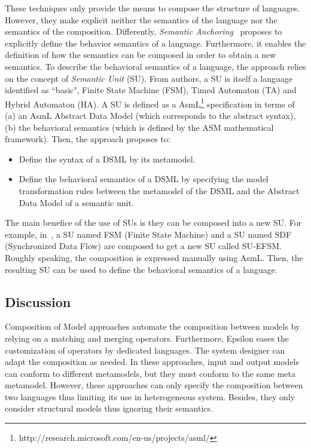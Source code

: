 These techniques only provide the means to compose the structure of languages. However, they make explicit neither the semantics of the language nor the semantics of the composition. Differently, \emph{Semantic Anchoring}~\cite{semanticsanchoring} proposes to explicitly define the behavior semantics of a language. Furthermore, it enables the definition of how the semantics can be composed in order to obtain a new semantics. To describe the behavioral semantics of a language, the approach relies on the concept of \emph{Semantic Unit} (SU). From authors, a SU is itself a language identified as ``basic", \eg Finite State Machine (FSM), Timed Automaton (TA) and Hybrid Automaton (HA). A SU is defined as a AsmL\footnote{http://research.microsoft.com/en-us/projects/asml/} specification in terms of (a) an AsmL Abstract Data Model (which corresponds to the abstract syntax), (b) the behavioral semantics (which is defined by the ASM mathematical framework). Then, the approach proposes to:
\begin{itemize}
	\item Define the syntax of a DSML by its metamodel. 
	\item Define the behavioral semantics of a DSML by specifying the model transformation rules between the metamodel of the DSML and the Abstract Data Model of a semantic unit. 
\end{itemize}    
The main benefice of the use of SUs is they can be composed into a new SU. For example, in~\cite{composemanticanch}, a SU named FSM (Finite State Machine) and a SU named SDF (Synchronized Data Flow) are composed to get a new SU called SU-EFSM. Roughly speaking, the composition is expressed manually using AsmL. Then, the resulting SU can be used to define the behavioral semantics of a language.

\subsection{Discussion}
Composition of Model approaches automate the composition between models by relying on a matching and merging operators. Furthermore, Epsilon eases the customization of operators by dedicated languages. The system designer can adapt the composition as needed. In these approaches, input and output models can conform to different metamodels, but they must conform to the same meta metamodel. However, these approaches can only specify the composition between two languages thus limiting its use in heterogeneous system. Besides, they only consider structural models thus ignoring their semantics.     

